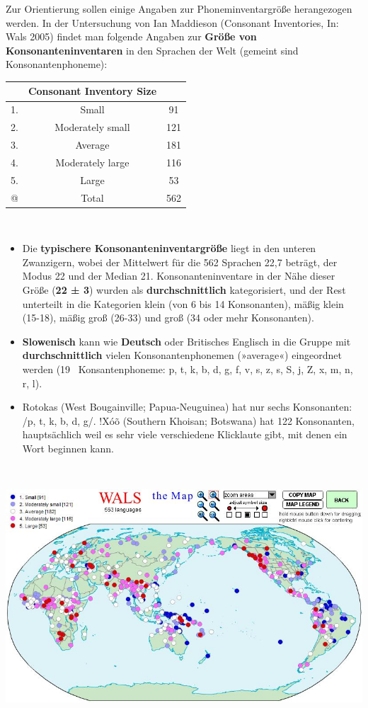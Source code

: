 \documentclass[
]{article}
\begin{document}
Zur Orientierung sollen einige Angaben zur Phoneminventargröße
herangezogen werden. In der Untersuchung von Ian Maddieson (Consonant
Inventories, In: Wals 2005) findet man folgende Angaben zur \textbf{Größe von
Konsonanteninventaren} in den Sprachen der Welt (gemeint sind
Konsonantenphoneme):

\begin{longtable}[]{@{}ccc@{}}
\toprule
~ & \textbf{Consonant Inventory Size} & ~ \\
\midrule
\endhead
1. & Small & 91 \\
2. & Moderately small & 121 \\
3. & Average & 181 \\
4. & Moderately large & 116 \\
5. & Large & 53 \\
@ & Total & 562 \\
\bottomrule
\end{longtable}

~

\begin{itemize}
\item
  Die \textbf{typischere Konsonanteninventargröße} liegt in den unteren
  Zwanzigern, wobei der Mittelwert für die 562 Sprachen 22,7 beträgt,
  der Modus 22 und der Median 21. Konsonanteninventare in der Nähe
  dieser Größe (\textbf{22 ± 3}) wurden als \textbf{durchschnittlich}
  kategorisiert, und der Rest unterteilt in die Kategorien klein (von
  6 bis 14 Konsonanten), mäßig klein (15-18), mäßig groß (26-33) und
  groß (34 oder mehr Konsonanten).
\item
  \textbf{Slowenisch} kann wie \textbf{Deutsch} oder Britisches Englisch in die
  Gruppe mit \textbf{durchschnittlich} vielen Konsonantenphonemen
  (»average«) eingeordnet werden (19~ Konsantenphoneme: p, t, k, b, d,
  g, f, v, s, z, s, S, j, Z, x, m, n, r, l).
\item
  Rotokas (West Bougainville; Papua-Neuguinea) hat nur sechs
  Konsonanten: /p, t, k, b, d, g/. !Xóõ (Southern Khoisan; Botswana)
  hat 122 Konsonanten, hauptsächlich weil es sehr viele verschiedene
  Klicklaute gibt, mit denen ein Wort beginnen kann.
\end{itemize}

~

\includegraphics[width=1\linewidth]{pictures/01b_NSG_Intro_2020-10-07/wals_consonant_inventories}
\end{document}

